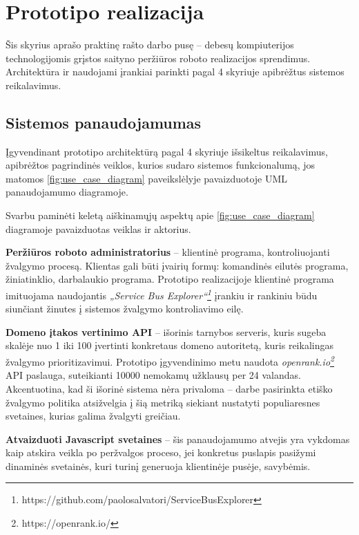 \section{Prototipo realizacija}

Šis skyrius aprašo praktinę rašto darbo pusę -- debesų kompiuterijos technologijomis grįstos saityno peržiūros roboto realizacijos sprendimus. Architektūra ir naudojami įrankiai parinkti pagal 4 skyriuje apibrėžtus sistemos reikalavimus.

\subsection{Sistemos panaudojamumas}

Įgyvendinant prototipo architektūrą pagal 4 skyriuje išsikeltus reikalavimus, apibrėžtos pagrindinės veiklos, kurios sudaro sistemos funkcionalumą, jos matomos \ref{fig:use_case_diagram} paveikslėlyje pavaizduotoje UML panaudojamumo diagramoje.



Svarbu paminėti keletą aiškinamųjų aspektų apie \ref{fig:use_case_diagram} diagramoje pavaizduotas veiklas ir aktorius.


\textbf{Peržiūros roboto administratorius} -- klientinė programa, kontroliuojanti žvalgymo procesą. Klientas gali būti įvairių formų: komandinės eilutės programa, žiniatinklio, darbalaukio programa. Prototipo realizacijoje klientinė programa imituojama naudojantis \textit{„Service Bus Explorer“\footnote{https://github.com/paolosalvatori/ServiceBusExplorer}} įrankiu ir rankiniu būdu siunčiant žinutes į sistemos žvalgymo kontroliavimo eilę.

\textbf{Domeno įtakos vertinimo API} -- išorinis tarnybos serveris, kuris sugeba skalėje nuo 1 iki 100 įvertinti konkretaus domeno autoritetą, kuris reikalingas žvalgymo prioritizavimui. Prototipo įgyvendinimo metu naudota \textit{openrank.io\footnote{https://openrank.io/}} API paslauga, suteikianti 10000 nemokamų užklausų per 24 valandas. Akcentuotina, kad ši išorinė sistema nėra privaloma -- darbe pasirinkta etiško žvalgymo politika atsižvelgia į šią metriką siekiant nustatyti populiaresnes svetaines, kurias galima žvalgyti greičiau.

\textbf{Atvaizduoti Javascript svetaines} -- šis panaudojamumo atvejis yra vykdomas kaip atskira veikla po peržvalgos proceso, jei konkretus puslapis pasižymi dinaminės svetainės, kuri turinį generuoja klientinėje pusėje, savybėmis.

